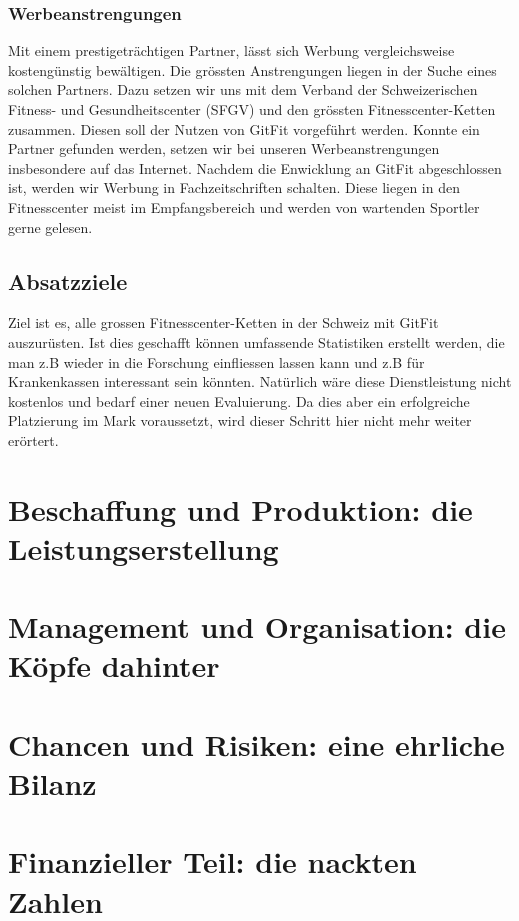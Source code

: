 \subsubsection{Werbeanstrengungen}
Mit einem prestigeträchtigen Partner, lässt sich Werbung vergleichsweise kostengünstig bewältigen. Die grössten Anstrengungen liegen in der Suche eines solchen Partners. Dazu setzen wir uns mit dem Verband der Schweizerischen Fitness- und Gesundheitscenter (SFGV) und den grössten Fitnesscenter-Ketten zusammen. Diesen soll der Nutzen von GitFit vorgeführt werden. Konnte ein Partner gefunden werden, setzen wir bei unseren Werbeanstrengungen insbesondere auf das Internet. Nachdem die Enwicklung an GitFit abgeschlossen ist, werden wir Werbung in Fachzeitschriften schalten. Diese liegen in den Fitnesscenter meist im Empfangsbereich und werden von wartenden Sportler gerne gelesen.

\subsection{Absatzziele}
Ziel ist es, alle grossen Fitnesscenter-Ketten in der Schweiz mit GitFit auszurüsten. Ist dies geschafft können umfassende Statistiken erstellt werden, die man z.B wieder in die Forschung einfliessen lassen kann und z.B für Krankenkassen interessant sein könnten. Natürlich wäre diese Dienstleistung nicht kostenlos und bedarf einer neuen Evaluierung. Da dies aber ein erfolgreiche Platzierung im Mark voraussetzt, wird dieser Schritt hier nicht mehr weiter erörtert.

\section{Beschaffung und Produktion: die Leistungserstellung}

\section{Management und Organisation: die Köpfe dahinter}

\section{Chancen und Risiken: eine ehrliche Bilanz}

\section{Finanzieller Teil: die nackten Zahlen}

